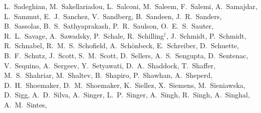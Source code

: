 {L.~Sadeghian,  %
M.~Sakellariadou,  %
L.~Salconi, %
M.~Saleem,  %
F.~Salemi,  %
A.~Samajdar,  %
L.~Sammut,  %
E.~J.~Sanchez,  %
V.~Sandberg,  %
B.~Sandeen,  %
J.~R.~Sanders,  %
B.~Sassolas, %
B.~S.~Sathyaprakash,  %
P.~R.~Saulson,  %
O.~E.~S.~Sauter,  %
R.~L.~Savage,  %
A.~Sawadsky,  %
P.~Schale,  %
R.~Schilling$^{\dag}$,  %
J.~Schmidt,  %
P.~Schmidt,  %
R.~Schnabel,  %
R.~M.~S.~Schofield,  %
A.~Sch\"onbeck,  %
E.~Schreiber,  %
D.~Schuette,  %
B.~F.~Schutz,  %
J.~Scott,  %
S.~M.~Scott,  %
D.~Sellers,  %
A.~S.~Sengupta,  %
D.~Sentenac, %
V.~Sequino, %
A.~Sergeev, 	%
Y.~Setyawati, %
D.~A.~Shaddock,  %
T.~Shaffer,  %
M.~S.~Shahriar,  %
M.~Shaltev,  %
B.~Shapiro,  %
P.~Shawhan,  %
A.~Sheperd,  %
D.~H.~Shoemaker,  %
D.~M.~Shoemaker,  %
K.~Siellez, %
X.~Siemens,  %
M.~Sieniawska, %
D.~Sigg,  %
A.~D.~Silva,	%
A.~Singer,  %
L.~P.~Singer,  %
A.~Singh,  %
R.~Singh,  %
A.~Singhal, %
A.~M.~Sintes,  %
}
